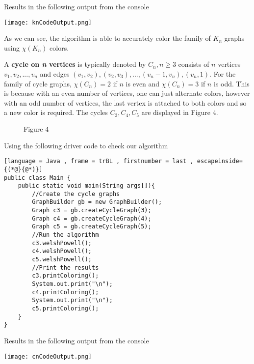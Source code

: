 \documentclass[12pt, letterpaper]{article}
\begin{document}
Results in the following output from the console


\begin{center}
\texttt{[image: knCodeOutput.png]}
\end{center}


As we can see, the algorithm is able to accurately color the family of $K_n$ graphs using $\chi(K_n)$ colors.


A \textbf{cycle on \textit{n} vertices} is typically denoted by $C_n,n\geq3$ consists of $n$ vertices $v_1,v_2,...,v_n$ and edges $(v_1,v_2),(v_2,v_3),...,(v_n-1,v_n),(v_n,1)$. For the family of cycle graphs, $\chi(C_n)=2$ if $n$ is even and $\chi(C_n)=3$ if $n$ is odd. This is because with an even number of vertices, one can just alternate colors, however with an odd number of vertices, the last vertex is attached to both colors and so a new color is required. The cycles $C_3,C_4,C_5$ are displayed in Figure 4.


\begin{figure}[h!]%
\begin{center}
	\qquad
	\qquad
	\caption*{Figure 4}
\end{center}
\end{figure}


Using the following driver code to check our algorithm


\begin{lstlisting}[language = Java , frame = trBL , firstnumber = last , escapeinside={(*@}{@*)}]
public class Main {
    public static void main(String args[]){
        //Create the cycle graphs
        GraphBuilder gb = new GraphBuilder();
        Graph c3 = gb.createCycleGraph(3);
        Graph c4 = gb.createCycleGraph(4);
        Graph c5 = gb.createCycleGraph(5);
        //Run the algorithm
        c3.welshPowell();
        c4.welshPowell();
        c5.welshPowell();
        //Print the results
        c3.printColoring();
        System.out.print("\n");
        c4.printColoring();
        System.out.print("\n");
        c5.printColoring();
    }
}
\end{lstlisting}


Results in the following output from the console


\begin{center}
\texttt{[image: cnCodeOutput.png]}
\end{center}
\end{document}
